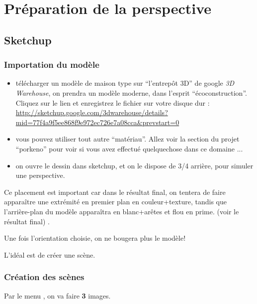 \documentclass[a4paper,12pt,french]{sphinxmanual}
\begin{document}
\section{Préparation de la perspective}
\label{psd/prepa-image_su+psd:prepa-image-su-psd}\label{psd/prepa-image_su+psd:preparation-de-la-perspective}\label{psd/prepa-image_su+psd::doc}

\subsection{Sketchup}
\label{psd/prepa-image_su+psd:sketchup}

\subsubsection{Importation du modèle}
\label{psd/prepa-image_su+psd:importation-du-modele}
\noindent{}
\begin{itemize}
\item {} 
télécharger un modèle de maison type sur ``l'entrepôt 3D'' de google \emph{3D Warehouse}, on prendra un modèle moderne, dans l'esprit ``écoconstruction''. Cliquez sur le lien et enregistrez le fichier sur votre disque dur : \url{http://sketchup.google.com/3dwarehouse/details?mid=77f4a9f5ee868f9e972ec726e7a08cca\&prevstart=0}

\item {} 
vous pouvez utiliser tout autre ``matériau''. Allez voir la section  du projet ``porkeno'' pour voir si vous avez effectué quelquechose dans ce domaine ...

\item {} 
on ouvre le dessin dans sketchup, et on le dispose de 3/4 arrière, pour simuler une perspective.

\end{itemize}

Ce placement est important car dans le résultat final, on tentera de faire apparaître une extrémité en premier plan en couleur+texture, tandis que l'arrière-plan du modèle apparaîtra en blanc+arêtes et flou en prime. (voir le résultat final) .

Une fois l'orientation choisie, on ne bougera plus le modèle!

L'idéal est de créer une scène.


\subsubsection{Création des scènes}
\label{psd/prepa-image_su+psd:creation-des-scenes}
Par le menu , on va faire \textbf{3} images.
\end{document}
